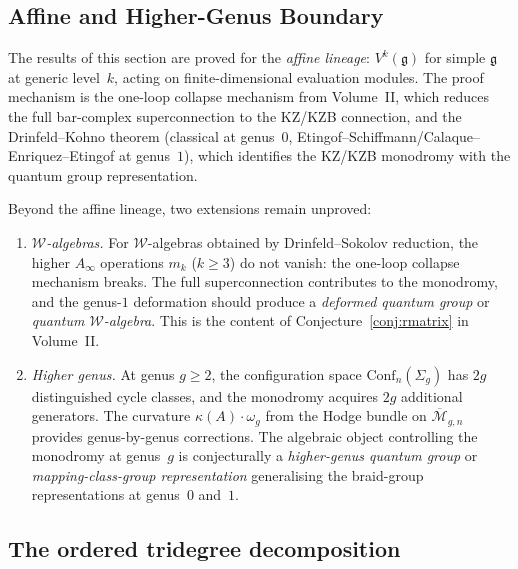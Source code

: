 \subsection{Affine and Higher-Genus Boundary}
\label{sec:genus1-frontier}

\begin{remark}
\label{rem:genus1-affine-lineage-boundary}
The results of this section are proved for the \emph{affine lineage}:
$V^k(\mathfrak{g})$ for simple $\mathfrak{g}$ at generic level~$k$,
acting on finite-dimensional evaluation modules. The proof mechanism
is the one-loop collapse mechanism from Volume~II,
which reduces the full bar-complex superconnection to the KZ/KZB
connection, and the Drinfeld--Kohno theorem (classical at genus~$0$,
Etingof--Schiffmann/Calaque--Enriquez--Etingof at genus~$1$), which
identifies the KZ/KZB monodromy with the quantum group representation.

Beyond the affine lineage, two extensions remain unproved:
\begin{enumerate}[label=\textup{(\alph*)}]
\item \emph{$\mathcal{W}$-algebras.}
For $\mathcal{W}$-algebras obtained by Drinfeld--Sokolov reduction,
the higher $A_\infty$ operations $m_k$ ($k \geq 3$) do not vanish:
the one-loop collapse mechanism breaks. The full superconnection
contributes to the monodromy, and the genus-$1$ deformation should
produce a \emph{deformed quantum group} or \emph{quantum
$\mathcal{W}$-algebra}. This is the content of
Conjecture~\ref*{conj:rmatrix} in Volume~II.

\item \emph{Higher genus.}
At genus $g \geq 2$, the configuration space
$\mathrm{Conf}_n(\Sigma_g)$ has $2g$ distinguished cycle classes,
and the monodromy acquires $2g$ additional generators. The
curvature $\kappa(A) \cdot \omega_g$ from the Hodge bundle on
$\overline{\mathcal{M}}_{g,n}$ provides genus-by-genus corrections.
The algebraic object controlling the monodromy at genus~$g$ is
conjecturally a \emph{higher-genus quantum group} or \emph{mapping-class-group
representation} generalising the braid-group representations at
genus~$0$ and~$1$.
\end{enumerate}
\end{remark}

\subsection{The ordered tridegree decomposition}
\label{subsec:ordered-tridegree}

